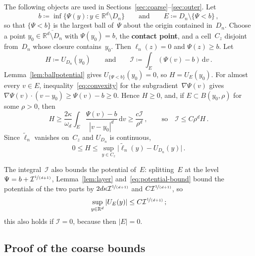 \documentclass[11pt]{amsart}
\theoremstyle{plain}
\theoremstyle{definition}
\newcommand{\R}{\mathbb R}
\newcommand{\drift}{\kappa}
\newcommand{\gauge}{\Psi}
\newcommand{\dd}{\,\mathrm d}
\newcommand{\defn}[1]{\textbf{#1}}
\newcommand{\nf}{\nicefrac}
\numberwithin{equation}{section}
\begin{document}
The following objects are used in Sections~\ref{sec:coarse}--\ref{sec:outer}. Let
\begin{equation*}
b\coloneqq\inf\{\gauge(y):y\in\R^d\setminus D_n\}\qquad\text{and}\qquad
E\coloneqq D_n\setminus\{\gauge<b\}\, ,
\end{equation*}
so that $\{\gauge<b\}$ is the largest ball of~$\gauge$ about the origin contained in~$D_n$. Choose a point $y_0\in\overline{\R^d\setminus D_n}$ with $\gauge(y_0)=b$, the \defn{contact point}, and a cell~$C_z$ disjoint from~$D_n$ whose closure contains~$y_0$. Then $\ell_n(z)=0$ and $\gauge(z)\geq b$. Let
\begin{equation*}
H\coloneqq U_{D_n}(y_0)\qquad\text{and}\qquad \mathcal I\coloneqq\int_E(\gauge(v)-b)\dd v\, .
\end{equation*}
Lemma~\ref{lem:ballpotential} gives $U_{\{\gauge<b\}}(y_0)=0$, so $H=U_E(y_0)$. For almost every $v\in E$, inequality~\eqref{eq:convexity} for the subgradient~$\nabla\gauge(v)$ gives $\nabla \gauge(v)\cdot(v-y_0)\geq \gauge(v)-b\geq0$. Hence $H\geq0$, and, if $E\subset B(y_0,\rho)$ for some $\rho>0$, then
\begin{equation}\label{eq:norm-excess}
H\geq\frac{2\drift}{\omega_d}\int_E\frac{\gauge(v)-b}{|v-y_0|^d}\dd v\geq\frac{c\mathcal I}{\rho^d}\, ,\qquad\text{so}\quad \mathcal I\leq C\rho^dH\, .
\end{equation}
Since $\widetilde\ell_n$ vanishes on~$C_z$ and $U_{D_n}$ is continuous,
\begin{equation}\label{eq:contact-error}
0\leq H\leq\sup_{y\in C_z}\bigl|\widetilde\ell_n(y)-U_{D_n}(y)\bigr|\, .
\end{equation}

The integral~$\mathcal I$ also bounds the potential of~$E$: splitting~$E$ at the level $\gauge=b+\mathcal I^{\nf{1}{(d+1)}}$, Lemma~\ref{lem:layer} and~\eqref{eq:potential-bound} bound the potentials of the two parts by $2d\drift\mathcal I^{\nf{1}{(d+1)}}$ and $C\mathcal I^{\nf{1}{(d+1)}}$, so
\begin{equation}\label{eq:layer-excess}
\sup_{y\in\R^d}|U_E(y)|\leq C\mathcal I^{\nf{1}{(d+1)}}\, ;
\end{equation}
this also holds if $\mathcal I=0$, because then $|E|=0$.

\subsection{Proof of the coarse bounds}
\end{document}
